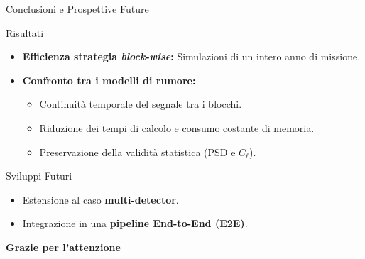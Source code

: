 \documentclass[10pt, aspectratio=169, handout]{beamer}
\begin{document}
\begin{frame}{Conclusioni e Prospettive Future}


  \begin{block}{Risultati}
    \footnotesize
    \begin{itemize}
      \item \textbf{Efficienza strategia \textit{block-wise}:} Simulazioni di un intero anno di missione.
      \item \textbf{Confronto tra i modelli di rumore:}
        \begin{itemize}
          \scriptsize
          \item Continuità temporale del segnale tra i blocchi.
          \item Riduzione dei tempi di calcolo e consumo costante di memoria.
          \item Preservazione della validità statistica (PSD e $C_\ell$).
        \end{itemize}
    \end{itemize}
  \end{block}

  \vspace{0.4cm}

  \begin{block}{Sviluppi Futuri}
    \footnotesize
    \begin{itemize}
      \item Estensione al caso \textbf{multi-detector}.
      \item Integrazione in una \textbf{pipeline End-to-End (E2E)}.
    \end{itemize}
  \end{block}

\end{frame}
\appendix







\begin{frame}[noframenumbering]
\begin{center}
\vspace{2cm}
{\Large\textbf{Grazie per l'attenzione}}

\vspace{1.5cm}
\end{center}
\end{frame}
\end{document}
